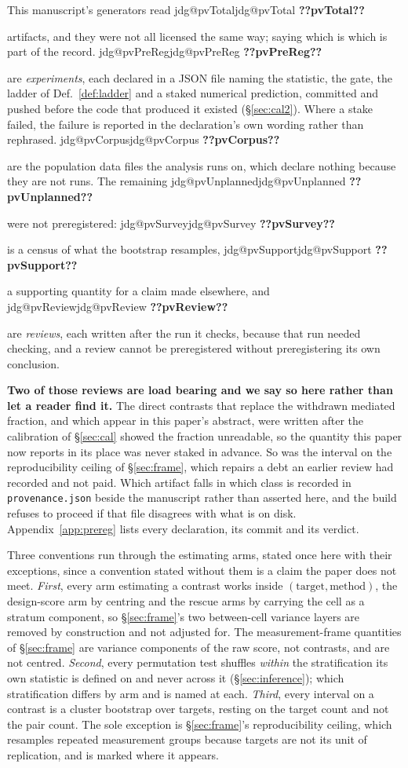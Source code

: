 \documentclass[11pt]{article}
\makeatletter
\newcommand{\jdg}[1]{%
  \ifcsname jdg@#1\endcsname\csname jdg@#1\endcsname
  \else\textbf{??#1??}\PackageError{rna}{undefined measured quantity #1}{}\fi}
\makeatother
\begin{document}
This manuscript's generators read \jdg{pvTotal} artifacts, and they were not all licensed the same
way; saying which is which is part of the record. \jdg{pvPreReg} are \emph{experiments}, each
declared in a JSON file naming the statistic, the gate, the ladder of Def.~\ref{def:ladder} and a
staked numerical prediction, committed and pushed before the code that produced it existed
(\S\ref{sec:cal2}). Where a stake failed, the failure is reported in the declaration's own wording
rather than rephrased. \jdg{pvCorpus} are the population data files the analysis runs on, which
declare nothing because they are not runs. The remaining \jdg{pvUnplanned} were not preregistered:
\jdg{pvSurvey} is a census of what the bootstrap resamples, \jdg{pvSupport} a supporting quantity
for a claim made elsewhere, and \jdg{pvReview} are \emph{reviews}, each written after the run it
checks, because that run needed checking, and a review cannot be preregistered without
preregistering its own conclusion.

\textbf{Two of those reviews are load bearing and we say so here rather than let a reader find
it.} The direct contrasts that replace the withdrawn mediated fraction, and which appear in this
paper's abstract, were written after the calibration of \S\ref{sec:cal} showed the fraction
unreadable, so the quantity this paper now reports in its place was never staked in advance. So
was the interval on the reproducibility ceiling of \S\ref{sec:frame}, which repairs a debt an
earlier review had recorded and not paid. Which artifact falls in which class is recorded in
\texttt{provenance.json} beside the manuscript rather than asserted here, and the build refuses to
proceed if that file disagrees with what is on disk. Appendix~\ref{app:prereg} lists every
declaration, its commit and its verdict.

Three conventions run through the estimating arms, stated once here with their exceptions, since a
convention stated without them is a claim the paper does not meet. \emph{First}, every arm
estimating a contrast works inside $(\text{target},\text{method})$, the design-score arm by
centring and the rescue arms by carrying the cell as a stratum component, so \S\ref{sec:frame}'s
two between-cell variance layers are removed by construction and not adjusted for. The
measurement-frame quantities of \S\ref{sec:frame} are variance components of the raw score, not
contrasts, and are not centred. \emph{Second}, every permutation test shuffles \emph{within} the
stratification its own statistic is defined on and never across it (\S\ref{sec:inference}); which
stratification differs by arm and is named at each. \emph{Third}, every interval on a contrast is a
cluster bootstrap over targets, resting on the target count and not the pair count. The sole
exception is \S\ref{sec:frame}'s reproducibility ceiling, which resamples repeated measurement
groups because targets are not its unit of replication, and is marked where it appears.
\end{document}

